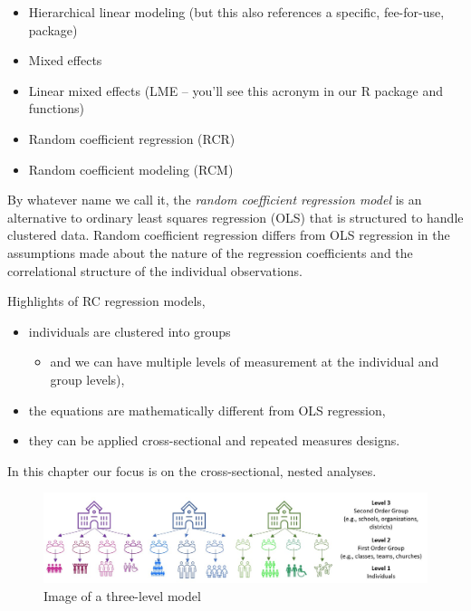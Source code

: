\documentclass[
  english,
]{book}
\providecommand{\tightlist}{%
  \setlength{\itemsep}{0pt}\setlength{\parskip}{0pt}}
\begin{document}
\begin{itemize}
\tightlist
\item
  Hierarchical linear modeling (but this also references a specific, fee-for-use, package)
\item
  Mixed effects
\item
  Linear mixed effects (LME -- you'll see this acronym in our R package and functions)
\item
  Random coefficient regression (RCR)
\item
  Random coefficient modeling (RCM)
\end{itemize}

By whatever name we call it, the \emph{random coefficient regression model} is an alternative to ordinary least squares regression (OLS) that is structured to handle clustered data. Random coefficient regression differs from OLS regression in the assumptions made about the nature of the regression coefficients and the correlational structure of the individual observations.

Highlights of RC regression models,

\begin{itemize}
\tightlist
\item
  individuals are clustered into groups

  \begin{itemize}
  \tightlist
  \item
    and we can have multiple levels of measurement at the individual and group levels),
  \end{itemize}
\item
  the equations are mathematically different from OLS regression,
\item
  they can be applied cross-sectional and repeated measures designs.
\end{itemize}

In this chapter our focus is on the cross-sectional, nested analyses.

\begin{figure}
\centering
\includegraphics{images/wiGroups/nesting.jpg}
\caption{Image of a three-level model}
\end{figure}
\end{document}
